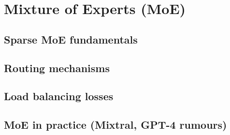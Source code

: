 
\section{Mixture of Experts (MoE)}

\subsection{Sparse MoE fundamentals}


\subsection{Routing mechanisms}


\subsection{Load balancing losses}


\subsection{MoE in practice (Mixtral, GPT-4 rumours)}


